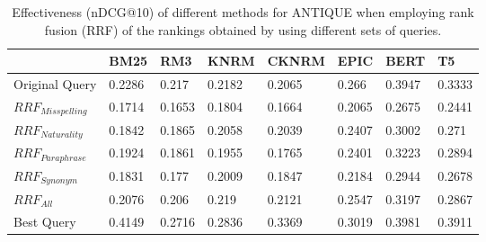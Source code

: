 \begin{table}[ht]
\centering
\caption{Effectiveness (nDCG@10) of different methods for ANTIQUE when employing rank fusion (RRF) of the rankings obtained by using different sets of queries.}
\label{tab:ant-fusion-table}
\begin{tabularx}{\columnwidth}{l|X|X|X|X|X|X|X}
\textbf{} & \textbf{BM25} & \textbf{RM3} & \textbf{KNRM} & \textbf{CKNRM} & \textbf{EPIC} & \textbf{BERT} & \textbf{T5} \\ \hline
Original Query   & 0.2286 & 0.217  & 0.2182  & 0.2065 & 0.266  & 0.3947  & 0.3333 \\ \hline
$RRF_{Misspelling}$ & 0.1714 & 0.1653 & 0.1804  & 0.1664 & 0.2065 & 0.2675  & 0.2441 \\
$RRF_{Naturality}$  & 0.1842 & 0.1865 & 0.2058  & 0.2039 & 0.2407 & 0.3002  & 0.271  \\
$RRF_{Paraphrase}$  & 0.1924 & 0.1861 & 0.1955  & 0.1765 & 0.2401 & 0.3223  & 0.2894 \\
$RRF_{Synonym}$     & 0.1831 & 0.177  & 0.2009  & 0.1847 & 0.2184 & 0.2944  & 0.2678 \\
$RRF_{All}$         & 0.2076 & 0.206  & 0.219   & 0.2121 & 0.2547 & 0.3197  & 0.2867 \\ \hline
Best Query       & 0.4149 & 0.2716 & 0.2836  & 0.3369 & 0.3019 & 0.3981  & 0.3911
\end{tabularx}%
\end{table}
